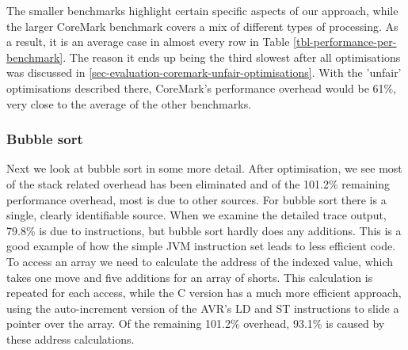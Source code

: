 The smaller benchmarks highlight certain specific aspects of our approach, while the larger CoreMark benchmark covers a mix of different types of processing. As a result, it is an average case in almost every row in Table \ref{tbl-performance-per-benchmark}. The reason it ends up being the third slowest after all optimisations was discussed in \ref{sec-evaluation-coremark-unfair-optimisations}. With the 'unfair' optimisations described there, CoreMark's performance overhead would be 61\%, very close to the average of the other benchmarks.

\subsubsection{Bubble sort}
\label{sec-evaluation-bubble-sort}
Next we look at bubble sort in some more detail. After optimisation, we see most of the stack related overhead has been eliminated and of the 101.2\% remaining performance overhead, most is due to other sources. For bubble sort there is a single, clearly identifiable source. When we examine the detailed trace output,  79.8\% is due to  instructions, but bubble sort hardly does any additions. This is a good example of how the simple JVM instruction set leads to less efficient code. To access an array we need to calculate the address of the indexed value, which takes one move and five additions for an array of shorts. This calculation is repeated for each access, while the C version has a much more efficient approach, using the auto-increment version of the AVR's LD and ST instructions to slide a pointer over the array. Of the remaining 101.2\% overhead, 93.1\% is caused by these address calculations.

%

